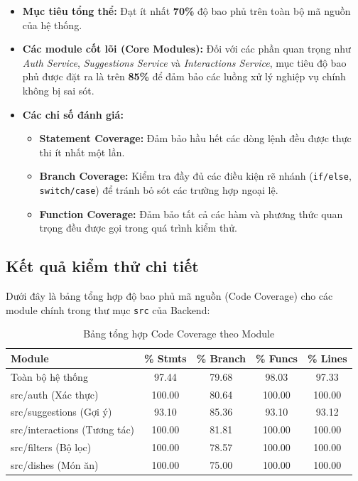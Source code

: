 \begin{itemize}
    \item \textbf{Mục tiêu tổng thể:} Đạt ít nhất \textbf{70\%} độ bao phủ trên toàn bộ mã nguồn của hệ thống.
    \item \textbf{Các module cốt lõi (Core Modules):} Đối với các phần quan trọng như \textit{Auth Service}, \textit{Suggestions Service} và \textit{Interactions Service}, mục tiêu độ bao phủ được đặt ra là trên \textbf{85\%} để đảm bảo các luồng xử lý nghiệp vụ chính không bị sai sót.
    \item \textbf{Các chỉ số đánh giá:}
    \begin{itemize}
        \item \textbf{Statement Coverage:} Đảm bảo hầu hết các dòng lệnh đều được thực thi ít nhất một lần.
        \item \textbf{Branch Coverage:} Kiểm tra đầy đủ các điều kiện rẽ nhánh (\texttt{if/else}, \texttt{switch/case}) để tránh bỏ sót các trường hợp ngoại lệ.
        \item \textbf{Function Coverage:} Đảm bảo tất cả các hàm và phương thức quan trọng đều được gọi trong quá trình kiểm thử.
    \end{itemize}
\end{itemize}


\subsection{Kết quả kiểm thử chi tiết}
Dưới đây là bảng tổng hợp độ bao phủ mã nguồn (Code Coverage) cho các module chính trong thư mục \texttt{src} của Backend:

\begin{table}[H]
\centering
\caption{Bảng tổng hợp Code Coverage theo Module}
\begin{tabular}{|l|c|c|c|c|}
\hline
\textbf{Module} & \textbf{\% Stmts} & \textbf{\% Branch} & \textbf{\% Funcs} & \textbf{\% Lines} \\ \hline
Toàn bộ hệ thống & 97.44 & 79.68 & 98.03 & 97.33 \\ \hline
src/auth (Xác thực) & 100.00 & 80.64 & 100.00 & 100.00 \\ \hline
src/suggestions (Gợi ý) & 93.10 & 85.36 & 93.10 & 93.12 \\ \hline
src/interactions (Tương tác) & 100.00 & 81.81 & 100.00 & 100.00 \\ \hline
src/filters (Bộ lọc) & 100.00 & 78.57 & 100.00 & 100.00 \\ \hline
src/dishes (Món ăn) & 100.00 & 75.00 & 100.00 & 100.00 \\ \hline
\end{tabular}
\end{table}

